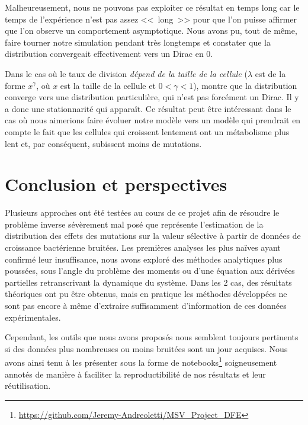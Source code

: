 \documentclass[12pt]{article}
\newcounter{prop}[section]
\begin{document}
Malheureusement, nous ne pouvons pas exploiter ce résultat en temps long car le temps de l'expérience n'est pas assez <<~long~>> pour que l'on puisse affirmer que l'on observe un comportement asymptotique. Nous avons pu, tout de même, faire tourner notre simulation pendant très longtemps et constater que la distribution convergeait effectivement vers un Dirac en 0.

Dans le cas où le taux de division \emph{dépend de la taille de la cellule} ($\lambda$ est de la forme $x^{\gamma}$, où $x$ est la taille de la cellule et $0<\gamma<1$), \cite{md2} montre que la distribution converge vers une distribution particulière, qui n'est pas forcément un Dirac. Il y a donc une stationnarité qui apparaît. Ce résultat peut être intéressant dans le cas où nous aimerions faire évoluer notre modèle vers un modèle qui prendrait en compte le fait que les cellules qui croissent lentement ont un métabolisme plus lent et, par conséquent, subissent moins de mutations.



\section{Conclusion et perspectives}

  Plusieurs approches ont été testées au cours de ce projet afin de résoudre le problème inverse sévèrement mal posé que représente l'estimation de la distribution des effets des mutations sur la valeur sélective à partir de données de croissance bactérienne bruitées. Les premières analyses les plus naïves ayant confirmé leur insuffisance, nous avons exploré des méthodes analytiques plus poussées, sous l'angle du problème des moments ou d'une équation aux dérivées partielles retranscrivant la dynamique du système. Dans les 2 cas, des résultats théoriques ont pu être obtenus, mais en pratique les méthodes développées ne sont pas encore à même d'extraire suffisamment d'information de ces données expérimentales.
  
  Cependant, les outils que nous avons proposés nous semblent toujours pertinents si des données plus nombreuses ou moins bruitées sont un jour acquises. Nous avons ainsi tenu à les présenter sous la forme de notebooks\footnote{\url{https://github.com/Jeremy-Andreoletti/MSV_Project_DFE}} soigneusement annotés de manière à faciliter la reproductibilité de nos résultats et leur réutilisation.
  
\end{document}
